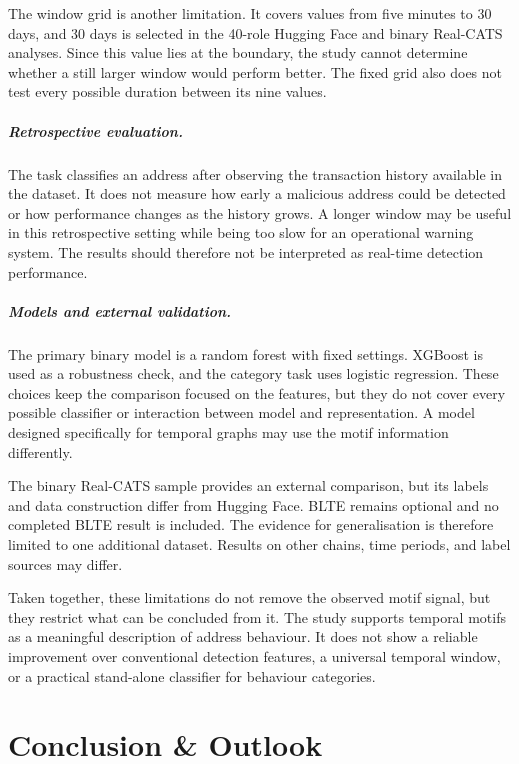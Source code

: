 \documentclass{thesisclass}
\begin{document}
The window grid is another limitation. It covers values from five minutes to 30
days, and 30 days is selected in the 40-role Hugging Face and binary Real-CATS
analyses. Since this value
lies at the boundary, the study cannot determine whether a still larger window
would perform better. The fixed grid also does not test every possible duration
between its nine values.

\paragraph{Retrospective evaluation.}
The task classifies an address after observing the transaction history available
in the dataset. It does not measure how early a malicious address could be
detected or how performance changes as the history grows. A longer window may be
useful in this retrospective setting while being too slow for an operational
warning system. The results should therefore not be interpreted as real-time
detection performance.

\paragraph{Models and external validation.}
The primary binary model is a random forest with fixed settings. XGBoost is used
as a robustness check, and the category task uses logistic regression. These
choices keep the comparison focused on the features, but they do not cover every
possible classifier or interaction between model and representation. A model
designed specifically for temporal graphs may use the motif information
differently.

The binary Real-CATS sample provides an external comparison, but its labels and
data construction differ from Hugging Face. BLTE remains optional and no completed
BLTE result is included. The evidence for generalisation is therefore limited to
one additional dataset. Results on other chains, time periods, and label sources
may differ.

Taken together, these limitations do not remove the observed motif signal, but
they restrict what can be concluded from it. The study supports temporal motifs
as a meaningful description of address behaviour. It does not show a reliable
improvement over conventional detection features, a universal temporal window,
or a practical stand-alone classifier for behaviour categories.


\chapter{Conclusion \& Outlook}
\label{ch:conclusion}
\end{document}

